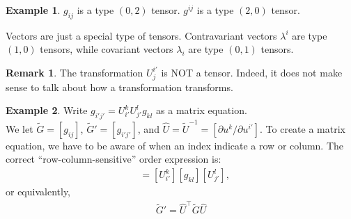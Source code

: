 \documentclass{book}
\theoremstyle{definition}
\newtheorem{rmk}{Remark}[section]
\newtheorem{exmp}{Example}[section]
\begin{document}
\begin{exmp}
	$g_{ij}$ is a type $(0,2)$ tensor. $g^{ij}$ is a type $(2,0)$ tensor. 
\end{exmp}
Vectors are just a special type of tensors. Contravariant vectors $\lambda^i$ are type $(1,0)$ tensors, while covariant vectors $\lambda_i$ are type $(0,1)$ tensors. 
\begin{rmk}
	The transformation $U^{i'}_j$ is NOT a tensor. Indeed, it does not make sense to talk about how a transformation transforms. 
\end{rmk}
\begin{exmp}
	Write $g_{i'j'} = U^k_{i'}U^l_{j'}g_{kl}$ as a matrix equation.\\
	
	We let $\tilde{G} = [g_{ij}]$, $\tilde{G}'= [g_{i'j'}]$, and $\hat{U} = \tilde{U}^{-1} = [\partial u^k/\partial u^{i'}]$. To create a matrix equation, we have to be aware of when an index indicate a row or column. The correct ``row-column-sensitive'' order expression is:
	\begin{align*}
	[g_{i'j'}] &= [U^{k}_{i'}][g_{kl}][U^l_{j'}],
	\end{align*}
	or equivalently,
	\begin{align*}
	\boxed{\tilde{G}' = \hat{U}^{\top}\tilde{G}\hat{U}}
	\end{align*}
\end{exmp}
\end{document}
